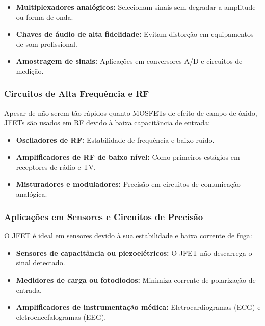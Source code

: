 \documentclass[12pt]{article}
\begin{document}
\begin{itemize}
    \item \textbf{Multiplexadores analógicos:} Selecionam sinais sem degradar a amplitude ou forma de onda.

    \item \textbf{Chaves de áudio de alta fidelidade:} Evitam distorção em equipamentos de som profissional.

    \item \textbf{Amostragem de sinais:} Aplicações em conversores A/D e circuitos de medição.
\end{itemize}

\subsubsection{Circuitos de Alta Frequência e RF}

Apesar de não serem tão rápidos quanto MOSFETs de efeito de campo de óxido, JFETs são usados em RF devido à baixa capacitância de entrada:

\begin{itemize}
    \item \textbf{Osciladores de RF:} Estabilidade de frequência e baixo ruído.

    \item \textbf{Amplificadores de RF de baixo nível:} Como primeiros estágios em receptores de rádio e TV.

    \item \textbf{Misturadores e moduladores:} Precisão em circuitos de comunicação analógica.
\end{itemize}

\subsubsection{Aplicações em Sensores e Circuitos de Precisão}

O JFET é ideal em sensores devido à sua estabilidade e baixa corrente de fuga:

\begin{itemize}
    \item \textbf{Sensores de capacitância ou piezoelétricos:} O JFET não descarrega o sinal detectado.

    \item \textbf{Medidores de carga ou fotodiodos:} Minimiza corrente de polarização de entrada.

    \item \textbf{Amplificadores de instrumentação médica:} Eletrocardiogramas (ECG) e eletroencefalogramas (EEG).
\end{itemize}
\end{document}
